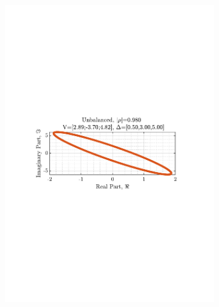 \documentclass[12pt]{article}
\numberwithin{equation}{section}
\begin{document}
\begin{figure}[H]
\begin{subfigure}{0.49\textwidth}
					\includegraphics[trim={2.2cm 11.2cm 3.00cm  11.2cm}, clip, width=\textwidth]{../MATLAB/figures/q3_1c_fig02.pdf} 
					\captionsetup{justification=centering}
				\end{subfigure}
			

\end{figure}
\end{document}
